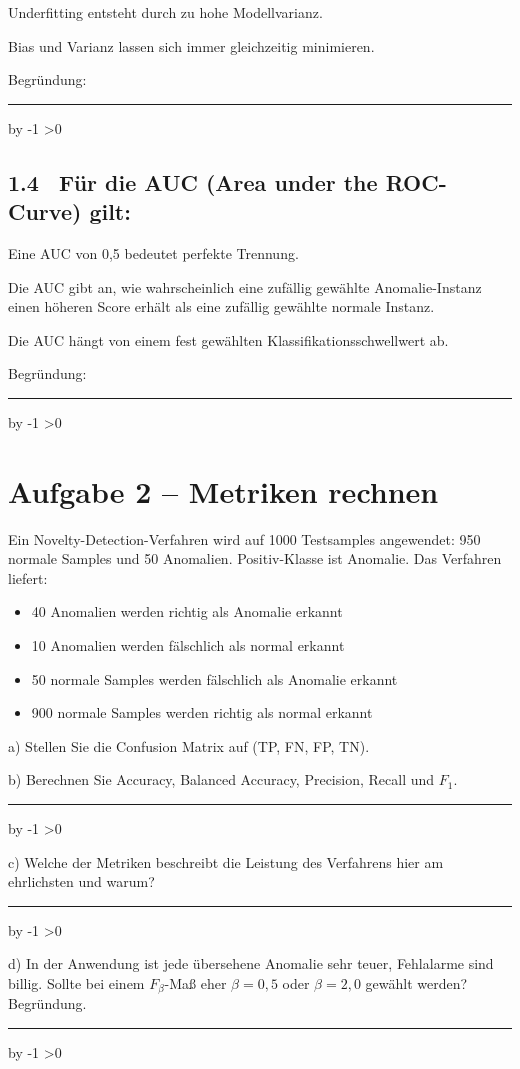\documentclass[10pt,a4paper]{article}
\newcommand{\mcbox}{\raisebox{-1pt}{\fbox{\rule{0pt}{7pt}\rule{7pt}{0pt}}}\hspace{6pt}}
\newcommand{\antwortlinien}[1]{%
  \par\vspace{2pt}%
  \newcount\zeilen \zeilen=#1
  \loop
    \noindent\rule{\linewidth}{0.4pt}\par\vspace{11pt}%
    \advance\zeilen by -1
  \ifnum\zeilen>0 \repeat
}
\begin{document}
\mcbox Underfitting entsteht durch zu hohe Modellvarianz.

\mcbox Bias und Varianz lassen sich immer gleichzeitig minimieren.

Begründung:
\antwortlinien{2}

\subsection*{1.4 \ Für die AUC (Area under the ROC-Curve) gilt:}
\mcbox Eine AUC von 0{,}5 bedeutet perfekte Trennung.

\mcbox Die AUC gibt an, wie wahrscheinlich eine zufällig gewählte Anomalie-Instanz
einen höheren Score erhält als eine zufällig gewählte normale Instanz.

\mcbox Die AUC hängt von einem fest gewählten Klassifikationsschwellwert ab.

Begründung:
\antwortlinien{2}

\section*{Aufgabe 2 -- Metriken rechnen}

Ein Novelty-Detection-Verfahren wird auf 1000 Testsamples angewendet:
950 normale Samples und 50 Anomalien. Positiv-Klasse ist \glqq Anomalie\grqq.
Das Verfahren liefert:
\begin{itemize}
  \item 40 Anomalien werden richtig als Anomalie erkannt
  \item 10 Anomalien werden fälschlich als normal erkannt
  \item 50 normale Samples werden fälschlich als Anomalie erkannt
  \item 900 normale Samples werden richtig als normal erkannt
\end{itemize}

a) Stellen Sie die Confusion Matrix auf (TP, FN, FP, TN).

\vspace{2.5cm}

b) Berechnen Sie Accuracy, Balanced Accuracy, Precision, Recall und $F_1$.
\antwortlinien{5}

c) Welche der Metriken beschreibt die Leistung des Verfahrens hier am ehrlichsten und warum?
\antwortlinien{3}

d) In der Anwendung ist jede übersehene Anomalie sehr teuer, Fehlalarme sind billig.
Sollte bei einem $F_\beta$-Maß eher $\beta=0{,}5$ oder $\beta=2{,}0$ gewählt werden? Begründung.
\antwortlinien{2}
\end{document}
